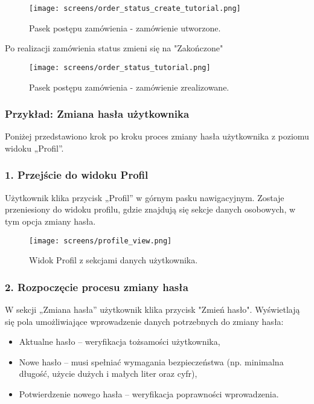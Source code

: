 \documentclass[12pt,a4paper,oneside]{article}
\theoremstyle{definition}
\numberwithin{equation}{section}
\begin{document}
\begin{figure}[H]
    \centering
    \texttt{[image: screens/order\_status\_create\_tutorial.png]}
    \caption{Pasek postępu zamówienia - zamówienie utworzone.}
    \label{fig:order_status_create_tutorial}
\end{figure}
\newpage
Po realizacji zamówienia status zmieni się na "Zakończone"

\begin{figure}[H]
    \centering
    \texttt{[image: screens/order\_status\_tutorial.png]}
    \caption{Pasek postępu zamówienia - zamówienie zrealizowane.}
    \label{fig:order_status_tutorial}
\end{figure}


\subsubsection{Przykład: Zmiana hasła użytkownika}
Poniżej przedstawiono krok po kroku proces zmiany hasła użytkownika z poziomu widoku „Profil”.

\subsubsection*{\textbf{1. Przejście do widoku Profil}}
Użytkownik klika przycisk „Profil” w górnym pasku nawigacyjnym. Zostaje przeniesiony do widoku profilu, gdzie znajdują się sekcje danych osobowych, w tym opcja zmiany hasła.

\begin{figure}[h!]
    \centering
    \texttt{[image: screens/profile\_view.png]}
    \caption{Widok Profil z sekcjami danych użytkownika.}
    \label{fig:profile_view_tutorial}
\end{figure}

\subsubsection*{\textbf{2. Rozpoczęcie procesu zmiany hasła}}
W sekcji „Zmiana hasła” użytkownik klika przycisk "Zmień hasło". Wyświetlają się pola umożliwiające wprowadzenie danych potrzebnych do zmiany hasła:
\begin{itemize}
    \item Aktualne hasło – weryfikacja tożsamości użytkownika,
    \item Nowe hasło – musi spełniać wymagania bezpieczeństwa (np. minimalna długość, użycie dużych i małych liter oraz cyfr),
    \item Potwierdzenie nowego hasła – weryfikacja poprawności wprowadzenia.
\end{itemize}
\end{document}
